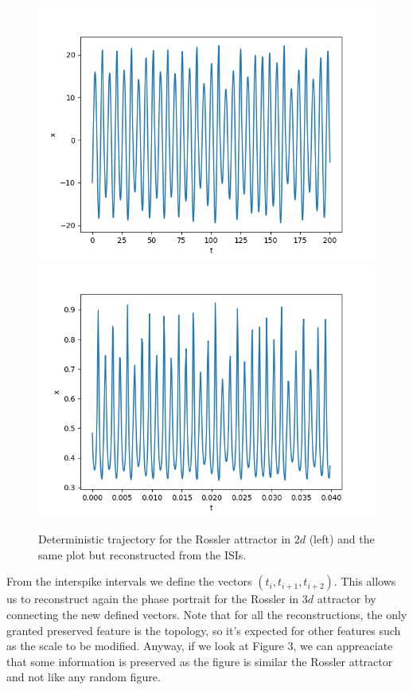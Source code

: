 \documentclass[10pt]{article}
\begin{document}
\begin{figure}[h!]
\centering
\includegraphics[scale=0.45]{real_trajectory_rossler} \includegraphics[scale=0.45]{reconstructed_trajectory_rossler}
\caption{Deterministic trajectory for the Rossler attractor in $2d$ (left) and the same plot but reconstructed from the ISIs.}
\label{fig:rossler_xprima}
\end{figure}

From the interspike intervals we define the vectors $(t_i,t_{i+1},t_{i+2})$. This allows us to reconstruct again the phase portrait for the Rossler in $3d$ attractor by connecting the new defined vectors. Note that for all the reconstructions, the only granted preserved feature is the topology, so it's expected for other features such as the scale to be modified. Anyway, if we look at Figure 3, we can appreaciate that some information is preserved as the figure is similar the Rossler attractor and not like any random figure.
\end{document}

